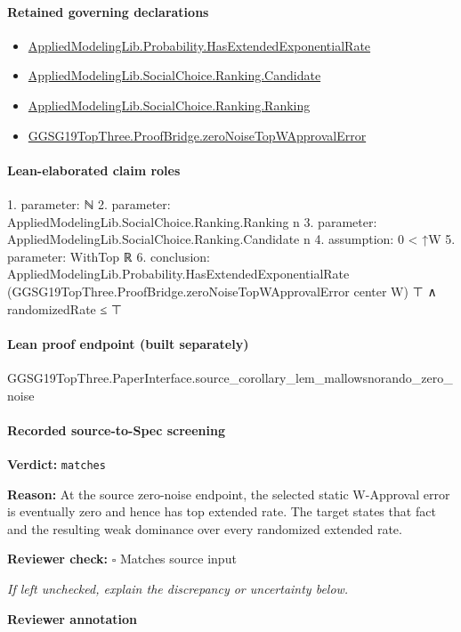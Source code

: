 \documentclass[10pt]{article}
\newcommand{\reviewerbox}{%
  \par\noindent\fbox{\parbox{0.96\linewidth}{\rule{0pt}{0.38in}}}\par
}
\newcommand{\reviewmatch}[1]{%
  \par\noindent\textbf{Reviewer check:} $\square$\; #1\par
  \noindent\emph{If left unchecked, explain the discrepancy or uncertainty below.}\par
}
\begin{document}
\paragraph{Retained governing declarations}
\begin{itemize}\raggedright
\item \hyperlink{governing-declaration-2dc367e1cad78521}{Applied\allowbreak{}Modeling\allowbreak{}Lib.\allowbreak{}Probability.\allowbreak{}Has\allowbreak{}Extended\allowbreak{}Exponential\allowbreak{}Rate}
\item \hyperlink{governing-declaration-8c0e6c25845ae78a}{Applied\allowbreak{}Modeling\allowbreak{}Lib.\allowbreak{}Social\allowbreak{}Choice.\allowbreak{}Ranking.\allowbreak{}Candidate}
\item \hyperlink{governing-declaration-5cde54446d1ae021}{Applied\allowbreak{}Modeling\allowbreak{}Lib.\allowbreak{}Social\allowbreak{}Choice.\allowbreak{}Ranking.\allowbreak{}Ranking}
\item \hyperlink{governing-declaration-c2605320557a7d84}{GGSG19\allowbreak{}Top\allowbreak{}Three.\allowbreak{}Proof\allowbreak{}Bridge.\allowbreak{}zero\allowbreak{}Noise\allowbreak{}Top\allowbreak{}W\allowbreak{}Approval\allowbreak{}Error}
\end{itemize}
\paragraph{Lean-elaborated claim roles}\begin{ReviewVerbatim}
1. parameter: ℕ
2. parameter: AppliedModelingLib.SocialChoice.Ranking.Ranking n
3. parameter: AppliedModelingLib.SocialChoice.Ranking.Candidate n
4. assumption: 0 < ↑W
5. parameter: WithTop ℝ
6. conclusion: AppliedModelingLib.Probability.HasExtendedExponentialRate
    (GGSG19TopThree.ProofBridge.zeroNoiseTopWApprovalError center W) ⊤ ∧
  randomizedRate ≤ ⊤
\end{ReviewVerbatim}

\paragraph{Lean proof endpoint (built separately)}\begin{ReviewVerbatim}
GGSG19TopThree.PaperInterface.source_corollary_lem_mallowsnorando_zero_noise
\end{ReviewVerbatim}

\paragraph{Recorded source-to-Spec screening}
\textbf{Verdict:} \texttt{matches}
\\
{\raggedright
\textbf{Reason:} At the source zero-\allowbreak{}noise endpoint, the selected static W-\allowbreak{}Approval error is eventually zero and hence has top extended rate.\allowbreak{} The target states that fact and the resulting weak dominance over every randomized extended rate.\allowbreak{}
\par}
\reviewmatch{Matches source input}
\noindent\textbf{Reviewer annotation}\par
\reviewerbox
\clearpage
\hypertarget{source-claim-57ef0e97610a7efd}{}
\end{document}
